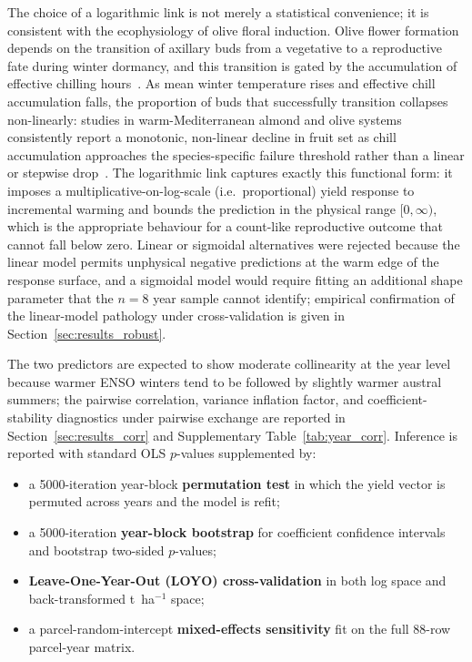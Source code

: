 \documentclass[agronomy,article,submit,pdftex,moreauthors]{Definitions/mdpi}
\begin{document}
The choice of a logarithmic link is not merely a statistical convenience; it is consistent with the ecophysiology of olive floral induction. Olive flower formation depends on the transition of axillary buds from a vegetative to a reproductive fate during winter dormancy, and this transition is gated by the accumulation of effective chilling hours~\cite{deMeloAbreu2004,rallo2013,benlloch2018}. As mean winter temperature rises and effective chill accumulation falls, the proportion of buds that successfully transition collapses non-linearly: studies in warm-Mediterranean almond and olive systems consistently report a monotonic, non-linear decline in fruit set as chill accumulation approaches the species-specific failure threshold rather than a linear or stepwise drop~\cite{benmoussa2017,fernandez2023chill,grillakis2022olive,calvo2024enso}. The logarithmic link captures exactly this functional form: it imposes a multiplicative-on-log-scale (i.e.\ proportional) yield response to incremental warming and bounds the prediction in the physical range $[0,\infty)$, which is the appropriate behaviour for a count-like reproductive outcome that cannot fall below zero. Linear or sigmoidal alternatives were rejected because the linear model permits unphysical negative predictions at the warm edge of the response surface, and a sigmoidal model would require fitting an additional shape parameter that the $n=8$ year sample cannot identify; empirical confirmation of the linear-model pathology under cross-validation is given in Section~\ref{sec:results_robust}.

The two predictors are expected to show moderate collinearity at the year level because warmer ENSO winters tend to be followed by slightly warmer austral summers; the pairwise correlation, variance inflation factor, and coefficient-stability diagnostics under pairwise exchange are reported in Section~\ref{sec:results_corr} and Supplementary Table~\ref{tab:year_corr}. Inference is reported with standard OLS $p$-values supplemented by:
\begin{itemize}
  \item a 5000-iteration year-block \textbf{permutation test} in which the yield vector is permuted across years and the model is refit;
  \item a 5000-iteration \textbf{year-block bootstrap} for coefficient confidence intervals and bootstrap two-sided $p$-values;
  \item \textbf{Leave-One-Year-Out (LOYO) cross-validation} in both log space and back-transformed t~ha$^{-1}$ space;
  \item a parcel-random-intercept \textbf{mixed-effects sensitivity} fit on the full 88-row parcel-year matrix.
\end{itemize}
\end{document}
